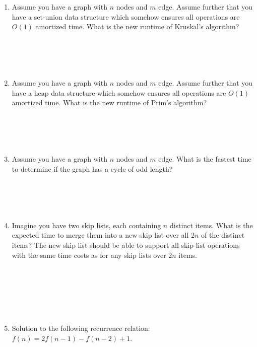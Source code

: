 \documentclass[11pt]{article}
\newcommand{\ans}[1]{}
\begin{document}
\begin{enumerate}
\begin{enumerate}
\item Assume you have a graph with $n$ nodes and $m$ edge.  Assume further that you have a set-union data structure which somehow ensures all operations are $O(1)$ amortized time.  What is the new runtime of Kruskal's algorithm? \ans{It is still $\theta(m \log n)$.} \\ \ \\ \ \\ \ \\ \ \\

\item Assume you have a graph with $n$ nodes and $m$ edge.  Assume further that you have a heap data structure which somehow ensures all operations are $O(1)$ amortized time.  What is the new runtime of Prim's algorithm?  \ans{It is now $\theta(m+n)$.} \\ \ \\ \ \\ \ \\ \ \\

\item Assume you have a graph with $n$ nodes and $m$ edge.  What is the fastest time to determine if the graph has a cycle of odd length?  \ans{It is $\theta(n+m)$} \\ \ \\ \ \\ \ \\ \ \\

\item Imagine you have two skip lists, each containing $n$ distinct items.  What is the expected time to merge them into a new skip list over all $2n$ of the distinct items?  The new skip list should be able to support all skip-list operations with the same time costs as for any skip lists over $2n$ items. 

\ans{$\theta(n)$.  Need to merge lists $L_{1}$ to $L_{x}$ where list $L_{i}$ contains $n/2^{i}$ records in expectation.  The cost of the merge is thus $n/2^{i-1}$.  Summing from $i = 1$ to $\infty$, we get cost $\theta(n)$} \ \\ \ \\ \ \\ \ \\ \ \\

\item Solution to the following recurrence relation: $f(n) = 2f(n-1) - f(n-2) + 1$. \ans{$\theta(n^{2})$ or $\theta(c_{1}n^{2} + c_{2}n + c_{3})$.  Annihilator is $(L - 1)^{3}$.} \\ \ \\ \ \\ \ \\ \ \\



\end{enumerate}
\end{enumerate}
\end{document}
